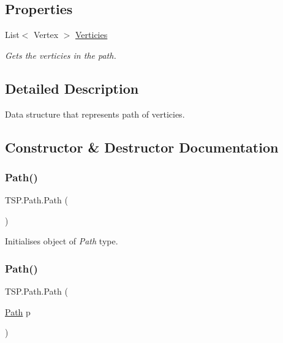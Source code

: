 \subsection*{Properties}
\begin{DoxyCompactItemize}
\item 
List$<$ Vertex $>$ \hyperlink{class_t_s_p_1_1_path_a38835275eabdb4069039af3c4e383ceb}{Verticies}
\begin{DoxyCompactList}\small\item\em Gets the verticies in the path. \end{DoxyCompactList}\end{DoxyCompactItemize}


\subsection{Detailed Description}
Data structure that represents path of verticies. 



\subsection{Constructor \& Destructor Documentation}
\mbox{\label{class_t_s_p_1_1_path_a7e0e3153773cfc55f12188e7391ca7e4}} 
\subsubsection{\texorpdfstring{Path()}{Path()}\hspace{0.1cm}{\footnotesize\ttfamily [1/2]}}
{\footnotesize\ttfamily T\+S\+P.\+Path.\+Path (\begin{DoxyParamCaption}{ }\end{DoxyParamCaption})\hspace{0.3cm}{\ttfamily [inline]}}



Initialises object of {\itshape Path}  type. 

\mbox{\label{class_t_s_p_1_1_path_aca57fab7fe67faf8661ba5b5c509cd65}} 
\subsubsection{\texorpdfstring{Path()}{Path()}\hspace{0.1cm}{\footnotesize\ttfamily [2/2]}}
{\footnotesize\ttfamily T\+S\+P.\+Path.\+Path (\begin{DoxyParamCaption}\item[{\hyperlink{class_t_s_p_1_1_path}{Path}}]{p }\end{DoxyParamCaption})\hspace{0.3cm}{\ttfamily [inline]}}



